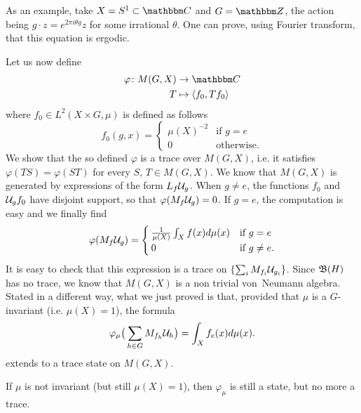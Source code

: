 As an example, take $X=S^1\subset \eC$ and $G=\eZ$, the action being $g\cdot z= e^{2\pi i\theta g}z$ for some irrational $\theta$. One can prove, using Fourier transform, that this equation is ergodic.

Let us now define
\begin{equation}
\begin{aligned}
  \varphi\colon M(G,X)&\to \eC \\ 
   T&\mapsto \langle f_0, Tf_0\rangle  
\end{aligned}
\end{equation}
where $f_0\in  L^2(X\times G,\mu)$ is defined as follows
\[ 
  f_0(g,x)=
\begin{cases}
\mu(X)^{-2}		&\text{if $g=e$}\\
0			&\text{otherwise.}
\end{cases}
\]
We show that the so defined $\varphi$ is a trace over $M(G,X)$, i.e. it satisfies $\varphi(TS)=\varphi(ST)$ for every $S$, $T\in M(G,X)$. We know that $M(G,X)$ is generated by expressions of the form $L_f\mathcal{U}_g$. When $g\neq e$, the functions $f_0$ and $\mathcal{U}_gf_0$ have disjoint support, so that $\varphi(M_f\mathcal{U}_g)=0$. If $g=e$, the computation is easy and we finally find
\begin{equation}
  \varphi(M_f\mathcal{U}_g)=
\begin{cases}
\frac{1}{ \mu(X) }\int_X f(x)d\mu(x)		&\text{if $g=e$}\\
0						&\text{if $g\neq e$}.
\end{cases}
\end{equation}
It is easy to check that this expression is a trace on $\{ \sum_iM_{f_i}\mathcal{U}_{g_i} \}$. Since $\mathfrak{B}(H)$ has no trace, we know that $M(G,X)$ is a non trivial von~Neumann algebra. Stated in a different way, what we just proved is that, provided that $\mu$ is a $G$-invariant  (i.e. $\mu(X)=1$), the formula
\begin{equation} 		\label{Eqvpmupickid}
  \varphi_{\mu}\big( \sum_{h\in G} M_{f_h}\mathcal{U}_h \big)=\int_X f_e(x)d\mu(x).
\end{equation}
extends to a trace state on $M(G,X)$.

\begin{proposition}
If $\mu$ is not invariant (but still $\mu(X)=1$), then $\varphi_{\mu}$ is still a state, but no more a trace.
\end{proposition}

